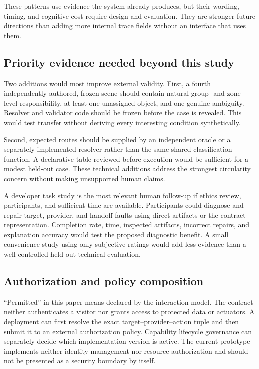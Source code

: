 These patterns use evidence the system already produces, but their wording,
timing, and cognitive cost require design and evaluation.  They are stronger
future directions than adding more internal trace fields without an interface
that uses them.

\subsection{Priority evidence needed beyond this study}

Two additions would most improve external validity.  First, a fourth
independently authored, frozen scene should contain natural group- and
zone-level responsibility, at least one unassigned object, and one genuine
ambiguity.  Resolver and validator code should be frozen before the case is
revealed.  This would test transfer without deriving every interesting
condition synthetically.

Second, expected routes should be supplied by an independent oracle or a
separately implemented resolver rather than the same shared classification
function.  A declarative table reviewed before execution would be sufficient
for a modest held-out case.  These technical additions address the strongest
circularity concern without making unsupported human claims.

A developer task study is the most relevant human follow-up if ethics review,
participants, and sufficient time are available.  Participants could diagnose
and repair target, provider, and handoff faults using direct artifacts or the
contract representation.  Completion rate, time, inspected artifacts,
incorrect repairs, and explanation accuracy would test the proposed diagnostic
benefit.  A small convenience study using only subjective ratings would add
less evidence than a well-controlled held-out technical evaluation.

\subsection{Authorization and policy composition}

``Permitted'' in this paper means declared by the interaction model.  The
contract neither authenticates a visitor nor grants access to protected data or
actuators.  A deployment can first resolve the exact target--provider--action
tuple and then submit it to an external authorization policy.  Capability
lifecycle governance can separately decide which implementation version is
active.  The current prototype implements neither identity management nor
resource authorization and should not be presented as a security boundary by
itself.

